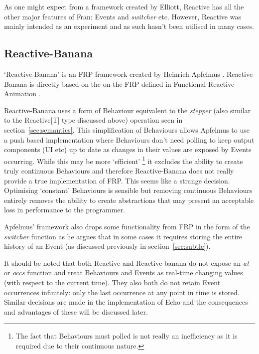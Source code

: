      As one might expect from a framework created by Elliott, Reactive has all the other major features
      of Fran: Events and \emph{switcher} etc. However, Reactive was mainly intended as an experiment
      and as such hasn't been utilised in many cases.
  
    \subsection{Reactive-Banana}
      `Reactive-Banana' is an FRP framework created by Heinrich Apfelmus \cite{Apfelmus}. Reactive-Banana
      is directly based on the on the FRP defined in Functional Reactive Animation \cite{Elliott1997}. 
      
      Reactive-Banana uses a form of Behaviour equivalent to the \emph{stepper}
      (also similar to the Reactive[T] type discussed above) operation seen in section~\ref{sec:semantics}. This simplification of Behaviours 
      allows 
      Apfelmus to use a push
      based implementation where Behaviours don't need polling to keep output components (UI etc) up to date as changes in 
      their values are exposed
      by Events occurring. While this may be more `efficient' \footnote{The fact that Behaviours must polled is not really an 
      inefficiency as it is required due to their continuous nature. } it excludes the ability to create truly 
      continuous Behaviours and therefore Reactive-Banana does not really provide a true implementation
      of FRP. This seems like a strange decision. Optimising `constant' Behaviours is sensible
      but removing continuous Behaviours entirely removes the ability to create abstractions that may present
      an acceptable loss in performance to the programmer.
      
      Apfelmus' framework also drops some functionality from FRP in the form of the \emph{switcher} function as
      he argues that in some cases it requires storing the entire history of an Event \cite{Apfelmus2011} (as discussed 
      previously
      in section~\ref{sec:subtle}).
      
    It should be noted that both Reactive and Reactive-banana do not expose an \emph{at} or \emph{occs} function
    and treat Behaviours and Events as real-time changing values (with respect to the current time). They also both do not 
    retain Event 
    occurrences infinitely: only the last occurrence at any point in time is stored. Similar decisions are made in the 
    implementation of Echo and the consequences and advantages of these will be discussed later.

